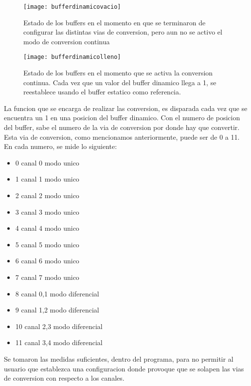 \begin{figure}[h]
  \centering
  \texttt{[image: bufferdinamicovacio]}
  \caption{Estado de los buffers en el momento en que se terminaron de configurar las distintas vias de conversion, pero aun no se activo el modo de conversion continua}\label{fig:bufferdinamicovacio}
\end{figure}


\begin{figure}[h]
  \centering
  \texttt{[image: bufferdinamicolleno]}
  \caption{Estado de los buffers en el momento que se activa la conversion continua. Cada vez que un valor del buffer dinamico llega a 1, se reestablece usando el buffer estatico como referencia.}\label{fig:bufferdinamicolleno}
\end{figure}

La funcion que se encarga de realizar las conversion, es disparada cada vez que se encuentra un 1 en una posicion del buffer dinamico. Con el numero de posicion del buffer, sabe el numero de la via de conversion por donde hay que convertir. Esta via de conversion, como mencionamos anteriormente, puede ser de 0 a 11. En cada numero, se mide lo siguiente:

\begin{itemize}
\item 0 \textrightarrow  canal 0 modo unico
\item 1 \textrightarrow  canal 1 modo unico
\item 2 \textrightarrow  canal 2 modo unico
\item 3 \textrightarrow  canal 3 modo unico
\item 4 \textrightarrow  canal 4 modo unico
\item 5 \textrightarrow  canal 5 modo unico
\item 6 \textrightarrow  canal 6 modo unico
\item 7 \textrightarrow  canal 7 modo unico
\item 8 \textrightarrow  canal 0,1 modo diferencial
\item 9 \textrightarrow  canal 1,2 modo diferencial
\item 10 \textrightarrow  canal 2,3 modo diferencial
\item 11 \textrightarrow  canal 3,4 modo diferencial
\end{itemize}


Se tomaron las medidas suficientes, dentro del programa, para no permitir al usuario que establezca una configuracion donde provoque que se solapen las vias de conversion con respecto a los canales. 

